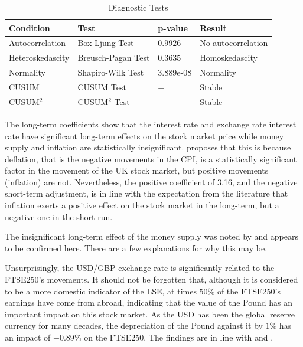 \documentclass[11pt,a4paper]{article}
\newcommand{\citeboth}[1]{\citeauthor{#1} \citep{#1}}
\begin{document}
\begin{table}[h!]
    \centering
    \caption{Diagnostic Tests}
    \begin{tabular}{llll}
        \toprule
        \textbf{Condition} & \textbf{Test} & \textbf{p-value} & \textbf{Result} \\
        \midrule
        Autocorrelation & Box-Ljung Test & $0.9926$ & No autocorrelation \\
        Heteroskedascity & Breusch-Pagan Test & $0.3635$ & Homoskedascity \\
        Normality & Shapiro-Wilk Test & $3.889$e-$08$ & Normality \\
        CUSUM & CUSUM Test & $-$ & Stable \\
        CUSUM$^2$ & CUSUM$^2$ Test & $-$ & Stable \\
        \bottomrule
    \end{tabular}
\end{table}

The long-term coefficients show that the interest rate and exchange rate
interest rate have significant long-term effects on the stock market price
while money supply and inflation are statistically insignificant. \citeboth{neifar2023}
proposes that this is because deflation, that is the negative movements in the 
CPI, is a statistically significant factor in the movement of the UK stock 
market, but positive movements (inflation) are not. Nevertheless, the positive
coefficient of 3.16, and the negative short-term adjustment, is in line with the expectation from the literature that 
inflation exerts a positive effect on the stock market in the long-term, but a negative 
one in the short-run. 

The insignificant long-term effect of the money supply 
was noted by \citeboth{pícha2017} and appears to be confirmed here. There are a few explanations
for why this may be.

Unsurprisingly, the USD/GBP exchange rate is significantly related to the FTSE250's movements. It 
should not be forgotten that, although it is considered to be a more domestic indicator of the LSE, 
at times $50\%$ of the FTSE250's earnings have come from abroad, indicating that 
the value of the Pound has an important impact on this stock market. As the USD has been 
the global reserve currency for many decades, the depreciation of the Pound 
against it by $1\%$ has an impact of $-0.89\%$ on the FTSE250. The findings 
are in line with \citeboth{neifar2023} and \citeboth{khan2018}.
\end{document}
